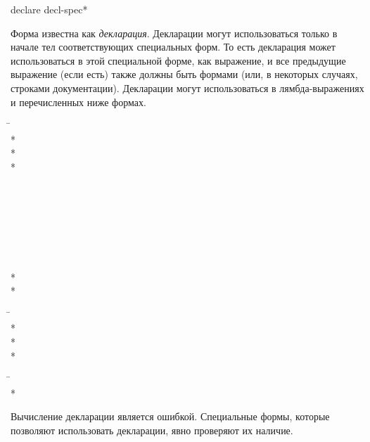 \begin{defspec}
declare {decl-spec}*

Форма  известна как \emph{декларация}.
Декларации могут использоваться только в начале тел соответствующих специальных
форм. То есть декларация может использоваться в этой специальной форме, как
выражение, и все предыдущие  выражение (если есть) также должны быть формами
 (или, в некоторых случаях, строками документации).
Декларации могут использоваться в лямбда-выражениях и перечисленных ниже формах.
\begin{lisp}
\hskip 12pc\=\kill
{}\> \\*
\> \\*
\> \\*
\> \\
\> \\
\> \\
\> \\
\> \\
\> \\
\> \\
\> \\*
\> \\*
\> \\
\>
\end{lisp}

\begin{lisp}
\hskip 12pc\=\kill
{}\> \\*
\> \\*
\> \\*
\end{lisp}

\begin{lisp}
\hskip 12pc\=\kill
{}\> \\*
\end{lisp}

Вычисление декларации является ошибкой. Специальные формы, которые позволяют
использовать декларации, явно проверяют их наличие.


\end{defspec}

